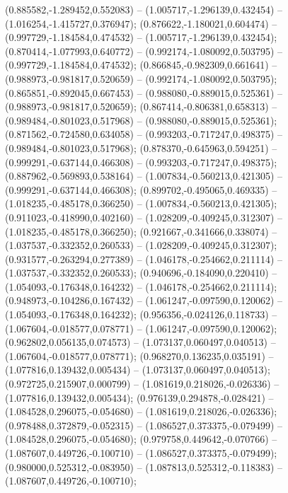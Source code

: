  (0.885582,-1.289452,0.552083) -- (1.005717,-1.296139,0.432454) -- (1.016254,-1.415727,0.376947);
 (0.876622,-1.180021,0.604474) -- (0.997729,-1.184584,0.474532) -- (1.005717,-1.296139,0.432454);
 (0.870414,-1.077993,0.640772) -- (0.992174,-1.080092,0.503795) -- (0.997729,-1.184584,0.474532);
 (0.866845,-0.982309,0.661641) -- (0.988973,-0.981817,0.520659) -- (0.992174,-1.080092,0.503795);
 (0.865851,-0.892045,0.667453) -- (0.988080,-0.889015,0.525361) -- (0.988973,-0.981817,0.520659);
 (0.867414,-0.806381,0.658313) -- (0.989484,-0.801023,0.517968) -- (0.988080,-0.889015,0.525361);
 (0.871562,-0.724580,0.634058) -- (0.993203,-0.717247,0.498375) -- (0.989484,-0.801023,0.517968);
 (0.878370,-0.645963,0.594251) -- (0.999291,-0.637144,0.466308) -- (0.993203,-0.717247,0.498375);
 (0.887962,-0.569893,0.538164) -- (1.007834,-0.560213,0.421305) -- (0.999291,-0.637144,0.466308);
 (0.899702,-0.495065,0.469335) -- (1.018235,-0.485178,0.366250) -- (1.007834,-0.560213,0.421305);
 (0.911023,-0.418990,0.402160) -- (1.028209,-0.409245,0.312307) -- (1.018235,-0.485178,0.366250);
 (0.921667,-0.341666,0.338074) -- (1.037537,-0.332352,0.260533) -- (1.028209,-0.409245,0.312307);
 (0.931577,-0.263294,0.277389) -- (1.046178,-0.254662,0.211114) -- (1.037537,-0.332352,0.260533);
 (0.940696,-0.184090,0.220410) -- (1.054093,-0.176348,0.164232) -- (1.046178,-0.254662,0.211114);
 (0.948973,-0.104286,0.167432) -- (1.061247,-0.097590,0.120062) -- (1.054093,-0.176348,0.164232);
 (0.956356,-0.024126,0.118733) -- (1.067604,-0.018577,0.078771) -- (1.061247,-0.097590,0.120062);
 (0.962802,0.056135,0.074573) -- (1.073137,0.060497,0.040513) -- (1.067604,-0.018577,0.078771);
 (0.968270,0.136235,0.035191) -- (1.077816,0.139432,0.005434) -- (1.073137,0.060497,0.040513);
 (0.972725,0.215907,0.000799) -- (1.081619,0.218026,-0.026336) -- (1.077816,0.139432,0.005434);
 (0.976139,0.294878,-0.028421) -- (1.084528,0.296075,-0.054680) -- (1.081619,0.218026,-0.026336);
 (0.978488,0.372879,-0.052315) -- (1.086527,0.373375,-0.079499) -- (1.084528,0.296075,-0.054680);
 (0.979758,0.449642,-0.070766) -- (1.087607,0.449726,-0.100710) -- (1.086527,0.373375,-0.079499);
 (0.980000,0.525312,-0.083950) -- (1.087813,0.525312,-0.118383) -- (1.087607,0.449726,-0.100710);
